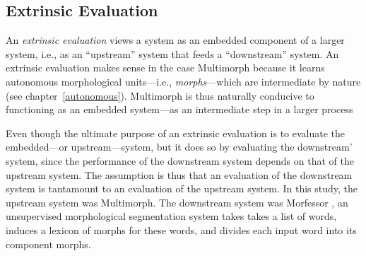 {\subsection{Extrinsic Evaluation} \label{sec:eval-extrinsic} An \emph{extrinsic evaluation} 
views a system as an embedded component of a larger system, i.e., as an ``upstream'' system that feeds a ``downstream''
system. An extrinsic evaluation makes sense in the case Multimorph because it learns autonomous morphological units---i.e., \emph{morphs}---which are intermediate by nature (see chapter~\ref{autonomous}).
Multimorph is thus naturally conducive to functioning as an embedded system---as an intermediate step in a larger process

Even though the ultimate purpose of an extrinsic evaluation is to evaluate the embedded---or upstream---system,
 but it does so by evaluating the downstream' system, since the
 performance of the downstream system depends on that of the upstream system. 
 The assumption is thus that an evaluation of the downstream system is tantamount to an evaluation of the upstream system.
In this study, the upstream system was Multimorph. The downstream system was
 Morfessor
\citep{creutz:2003, creutz-and-lagus:2005, creutz-et-al:2006, creutz-and-lagus:2007}, an 
unsupervised morphological segmentation 
system takes takes a list of words, induces a lexicon of morphs 
for these words, and divides each input word into its component morphs.
}
